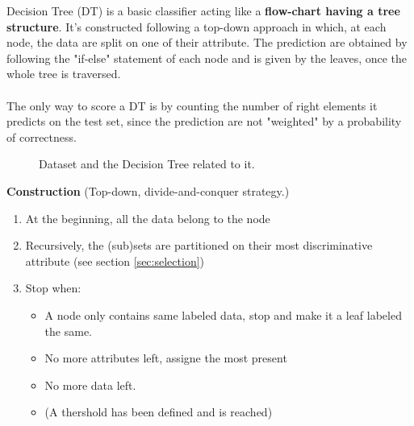 Decision Tree (DT) is a basic classifier acting like a \textbf{flow-chart having a tree structure}. It's constructed following a top-down approach in which, at each node, the data are split on one of their attribute. The prediction are obtained by following the "if-else" statement of each node and is given by the leaves, once the whole tree is traversed.
\\\\
The only way to score a DT is by counting the number of right elements it predicts on the test set, since the prediction are not "weighted" by a probability of correctness.

\begin{figure}[H] %
\centerline{
}
\caption{\label{DT} 
Dataset and the Decision Tree related to it.
}
\end{figure}

\textbf{Construction} (Top-down, divide-and-conquer strategy.)
\begin{enumerate}
  \item At the beginning, all the data belong to the node
  \item Recursively, the (sub)sets are partitioned on their most discriminative attribute (see section \ref{sec:selection})
  \item Stop when:
  \begin{itemize}
  	\item A node only contains same labeled data, stop and make it a leaf labeled the same.
  	\item No more attributes left, assigne the most present
  	\item No more data left.
  	\item (A thershold has been defined and is reached)
  \end{itemize}
\end{enumerate}

